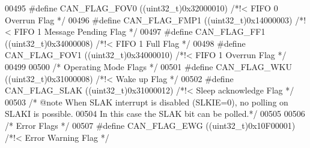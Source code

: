 \begin{DoxyCode}
00495 \textcolor{preprocessor}{#}\textcolor{preprocessor}{define} \textcolor{preprocessor}{CAN\_FLAG\_FOV0}              \textcolor{preprocessor}{(}\textcolor{preprocessor}{(}\textcolor{preprocessor}{uint32\_t}\textcolor{preprocessor}{)}0x32000010\textcolor{preprocessor}{)} \textcolor{comment}{/*!< FIFO 0 Overrun Flag         */}
00496 \textcolor{preprocessor}{#}\textcolor{preprocessor}{define} \textcolor{preprocessor}{CAN\_FLAG\_FMP1}              \textcolor{preprocessor}{(}\textcolor{preprocessor}{(}\textcolor{preprocessor}{uint32\_t}\textcolor{preprocessor}{)}0x14000003\textcolor{preprocessor}{)} \textcolor{comment}{/*!< FIFO 1 Message Pending Flag */}
00497 \textcolor{preprocessor}{#}\textcolor{preprocessor}{define} \textcolor{preprocessor}{CAN\_FLAG\_FF1}               \textcolor{preprocessor}{(}\textcolor{preprocessor}{(}\textcolor{preprocessor}{uint32\_t}\textcolor{preprocessor}{)}0x34000008\textcolor{preprocessor}{)} \textcolor{comment}{/*!< FIFO 1 Full Flag            */}
00498 \textcolor{preprocessor}{#}\textcolor{preprocessor}{define} \textcolor{preprocessor}{CAN\_FLAG\_FOV1}              \textcolor{preprocessor}{(}\textcolor{preprocessor}{(}\textcolor{preprocessor}{uint32\_t}\textcolor{preprocessor}{)}0x34000010\textcolor{preprocessor}{)} \textcolor{comment}{/*!< FIFO 1 Overrun Flag         */}
00499 
00500 \textcolor{comment}{/* Operating Mode Flags */}
00501 \textcolor{preprocessor}{#}\textcolor{preprocessor}{define} \textcolor{preprocessor}{CAN\_FLAG\_WKU}               \textcolor{preprocessor}{(}\textcolor{preprocessor}{(}\textcolor{preprocessor}{uint32\_t}\textcolor{preprocessor}{)}0x31000008\textcolor{preprocessor}{)} \textcolor{comment}{/*!< Wake up Flag */}
00502 \textcolor{preprocessor}{#}\textcolor{preprocessor}{define} \textcolor{preprocessor}{CAN\_FLAG\_SLAK}              \textcolor{preprocessor}{(}\textcolor{preprocessor}{(}\textcolor{preprocessor}{uint32\_t}\textcolor{preprocessor}{)}0x31000012\textcolor{preprocessor}{)} \textcolor{comment}{/*!< Sleep acknowledge Flag */}
00503 \textcolor{comment}{/* @note When SLAK interrupt is disabled (SLKIE=0), no polling on SLAKI is possible. }
00504 \textcolor{comment}{         In this case the SLAK bit can be polled.*/}
00505 
00506 \textcolor{comment}{/* Error Flags */}
00507 \textcolor{preprocessor}{#}\textcolor{preprocessor}{define} \textcolor{preprocessor}{CAN\_FLAG\_EWG}               \textcolor{preprocessor}{(}\textcolor{preprocessor}{(}\textcolor{preprocessor}{uint32\_t}\textcolor{preprocessor}{)}0x10F00001\textcolor{preprocessor}{)} \textcolor{comment}{/*!< Error Warning Flag   */}

\end{DoxyCode}
